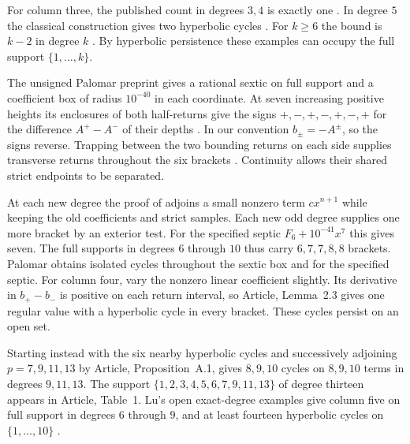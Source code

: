 For column three, the published count in degrees $3,4$ is exactly one
\cite{LMP,LL}. In degree $5$ the classical construction gives two
hyperbolic cycles \cite[p.~336]{LMP}. For $k\ge6$ the bound is $k-2$
in degree $k$ \cite[Theorem~1]{DMH}. By hyperbolic persistence these
examples can occupy the full support $\{1,\ldots,k\}$.

The unsigned Palomar preprint gives a rational sextic on full support
and a coefficient box of radius $10^{-40}$ in each coordinate. At
seven increasing positive heights its enclosures of both half-returns
give the signs $+,-,+,-,+,-,+$ for the difference $A^+-A^-$ of their
depths \cite[table \emph{Certified half-returns} and appendix]{Palomar}.
In our convention $b_\pm=-A^\pm$, so the signs reverse. Trapping between
the two bounding returns on each side supplies transverse returns
throughout the six brackets \cite[subsection \emph{Trapping}]{Palomar}.
Continuity allows their shared strict endpoints to be separated.

At each new degree the proof of \cite[Theorem~2]{Palomar} adjoins a
small nonzero term $cx^{n+1}$ while keeping the old coefficients and
strict samples. Each new odd degree supplies one more bracket by an
exterior test. For the specified septic $F_6+10^{-41}x^7$ this gives
seven. The full supports in degrees $6$ through $10$ thus carry
$6,7,7,8,8$ brackets. Palomar obtains isolated cycles throughout
the sextic box and for the specified septic. For column four, vary
the nonzero linear coefficient slightly. Its derivative in $b_+-b_-$
is positive on each return interval, so Article, Lemma~2.3 gives one
regular value with a hyperbolic cycle in every bracket. These cycles
persist on an open set.

Starting instead with the six nearby hyperbolic cycles and successively
adjoining $p=7,9,11,13$ by Article, Proposition~A.1, gives $8,9,10$
cycles on $8,9,10$ terms in degrees $9,11,13$. The
support $\{1,2,3,4,5,6,7,9,11,13\}$ of degree thirteen appears
in Article, Table~1. Lu's open exact-degree examples give column five
on full support in degrees $6$ through $9$, and at least fourteen
hyperbolic cycles on $\{1,\ldots,10\}$
\cite[supplement, Proposition~S1.2]{LuDegree}.

